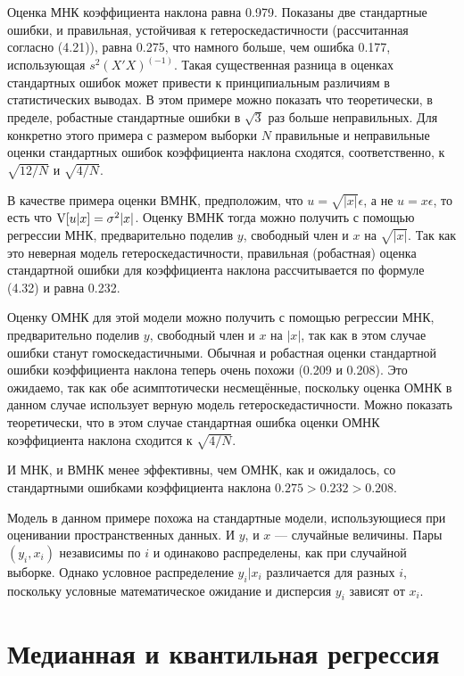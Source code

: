Оценка МНК коэффициента наклона равна 0.979. Показаны две стандартные ошибки, и правильная, устойчивая к гетероскедастичности (рассчитанная согласно (4.21)), равна 0.275, что намного больше, чем ошибка 0.177, использующая $s^2(X'X)^(-1)$. Такая существенная разница в оценках стандартных ошибок может привести к принципиальным различиям в статистических выводах. В этом примере можно показать что теоретически, в пределе, робастные стандартные ошибки в $\sqrt{3}$ раз больше неправильных. Для конкретно этого примера с размером выборки $N$ правильные и неправильные оценки стандартных ошибок коэффициента наклона сходятся, соответственно, к $\sqrt{12 / N}$ и $\sqrt{4 / N}$. 

В качестве примера оценки ВМНК, предположим, что $u = \sqrt{|x|}\epsilon$, а не $u = x\epsilon$, то есть что $\mathrm{V} [u|x] = \sigma^2 |x|$. Оценку ВМНК тогда можно получить с помощью регрессии МНК, предварительно поделив $y$, свободный член и $x$ на $\sqrt{|x|}$. Так как это неверная модель гетероскедастичности, правильная (робастная) оценка стандартной ошибки для коэффициента наклона рассчитывается по формуле (4.32) и равна 0.232.

Оценку ОМНК для этой модели можно получить с помощью регрессии МНК, предварительно поделив $y$, свободный член и $x$ на $|x|$, так как в этом случае ошибки станут гомоскедастичными. Обычная и робастная оценки стандартной ошибки коэффициента наклона теперь очень похожи (0.209 и 0.208). Это ожидаемо, так как обе асимптотически несмещённые, поскольку оценка ОМНК в данном случае использует верную модель гетероскедастичности. Можно показать теоретически, что в этом случае стандартная ошибка оценки ОМНК коэффициента наклона сходится к $\sqrt{4 / N}$. 

И МНК, и ВМНК менее эффективны, чем ОМНК, как и ожидалось, со стандартными ошибками коэффициента наклона $0.275 >  0.232 > 0.208$.

Модель в данном примере похожа на стандартные модели, использующиеся при оценивании пространственных данных. И $y$, и $x$ --- случайные величины.  Пары $(y_i, x_i)$ независимы по $i$ и одинаково распределены, как при случайной выборке. Однако условное распределение $y_i|x_i$ различается для разных $i$, поскольку условные математическое ожидание и дисперсия $y_i$ зависят от $x_i$.

\section{Медианная и квантильная регрессия}

